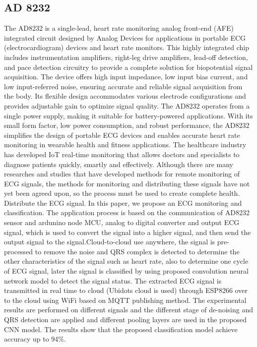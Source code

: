 \subsection{AD 8232}
The AD8232 is a single-lead, heart rate monitoring analog front-end (AFE) integrated circuit designed by Analog Devices for applications in portable ECG (electrocardiogram) devices and heart rate monitors. This highly integrated chip includes instrumentation amplifiers, right-leg drive amplifiers, lead-off detection, and pace detection circuitry to provide a complete solution for biopotential signal acquisition. The device offers high input impedance, low input bias current, and low input-referred noise, ensuring accurate and reliable signal acquisition from the body. Its flexible design accommodates various electrode configurations and provides adjustable gain to optimize signal quality. The AD8232 operates from a single power supply, making it suitable for battery-powered applications. With its small form factor, low power consumption, and robust performance, the AD8232 simplifies the design of portable ECG devices and enables accurate heart rate monitoring in wearable health and fitness applications.
The healthcare industry has developed IoT real-time monitoring that allows doctors and specialists to diagnose patients quickly, smartly and effectively. Although there are many researches and studies that have developed methods for remote monitoring of ECG signals, the methods for monitoring and distributing these signals have not yet been agreed upon, so the process must be used to create complete health. Distribute the ECG signal. In this paper, we propose an ECG monitoring and classification. The application process is based on the communication of AD8232 sensor and ardunino node MCU, analog to digital converter and output ECG signal, which is used to convert the signal into a higher signal, and then send the output signal to the signal.Cloud-to-cloud use anywhere, the signal is pre-processed to remove the noise and QRS complex\cite{morshedlou2021ultra} is detected to determine the other characteristics of the signal such as heart rate, also to determine one cycle of ECG signal, later the signal is classified by using proposed  convolution neural network model  to detect the signal status. The extracted ECG signal is transmitted in real time to cloud (Ubidots cloud is used) through ESP8266 over to the cloud using WiFi based on MQTT publishing method. The experimental results are performed on different signals and the different stage of de-noising and QRS detection are applied and  different pooling layers are used in the proposed CNN model\cite{marriwala2023hybrid}.  The results show that the proposed classification model achieve accuracy up to 94\%.
